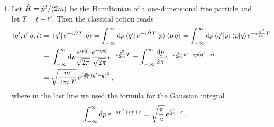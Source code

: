 \begin{sol}
\begin{enumerate}[label=\alph*)]
    \item Let $\hat{H} = \hat{p}^2/(2m)$ be the Hamiltonian of a one-dimensional free particle and let $T=t-t'$. Then the classical action reads
    \begin{align}
        \bra{q', t'}\ket{q, t} 
        = &\; \bra{q'}e^{-i\hat{H} T}\ket{q} = \int_{-\infty}^\infty {\rm d} p \bra{q'}e^{-i\hat{H} T}\ket{p} \braket{p}{q} = \int_{-\infty}^\infty {\rm d} p \braket{q'}{p} \braket{p}{q} e^{-i \frac{p^2}{2m}T} \notag \\
        = &\; \int_{-\infty}^\infty {\rm d} p \frac{e^{ipq'}}{\sqrt{2\pi}} \frac{e^{- ipq}}{\sqrt{2\pi}} e^{-i \frac{p^2}{2m}T} = \int_{-\infty}^\infty \frac{{\rm d} p}{2\pi}  e^{-i \frac{T}{2m} p^2 + ip(q'-q) } \notag \\
        = &\; \sqrt{\frac{m}{2\pi i \, T}} \, e^{i\frac{m}{2T} (q' - q)^2}
        \label{Eq_Ex22_first_result} \, ,
    \end{align}
    where in the last line we used the formula for the Gaussian integral
    \begin{equation}
        \int_{-\infty}^{\infty} {\rm d} p \, e^{-a p^2 + b p + c} = \sqrt{\frac{\pi}{a}} \, e^{\frac{b^2}{4a} + c}\, .
        \label{Eq_Ex22_gaussian_integral}
    \end{equation}


\end{enumerate}
\end{sol}
